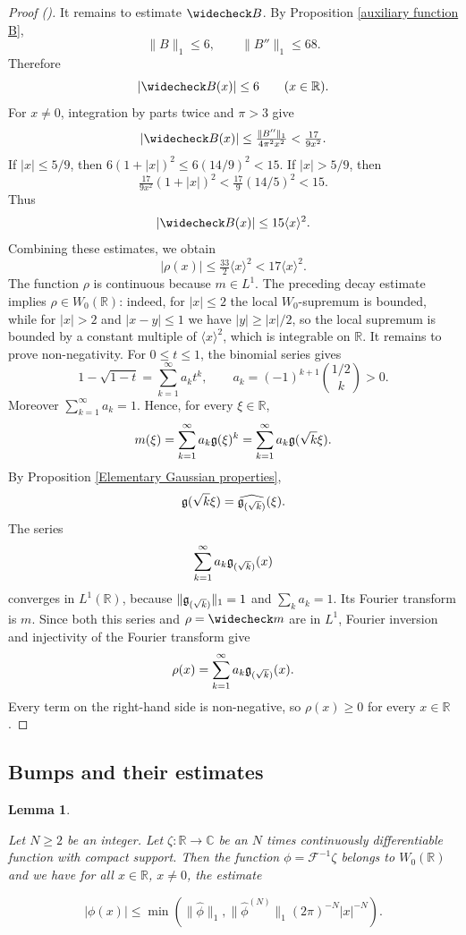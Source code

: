 \documentclass[12pt,reqno]{amsart}
\newcommand{\auto}{{({\tiny\faCar})}}
\theoremstyle{plain}
\newtheorem{lemma}[theorem]{Lemma}
\numberwithin{equation}{section}
\theoremstyle{remark}
\newcommand{\uses}[1]{}
\newcommand{\usesdefs}[1]{}
\newcommand{\leanok}{}
\newcommand{\lean}[1]{}
\newcommand{\R}{{\mathbb R}}
\newcommand{\C}{{\mathbb C}}
\begin{document}
\begin{proof}[Proof \auto]
It remains to estimate \(\widecheck B\). By Proposition \ref{auxiliary function B},
\[
    \|B\|_1\le 6,
    \qquad
    \|B''\|_1\le 68.
\]
Therefore
\[
    |\widecheck B(x)|\le 6
    \qquad (x\in\R).
\]
For \(x\neq 0\), integration by parts twice and $\pi>3$ give
\[
    |\widecheck B(x)|
    \le
    \tfrac{\|B''\|_1}{4\pi^2x^2}
    <
    \tfrac{17}{9x^2}.
\]
If $|x|\le5/9$, then
$6(1+|x|)^2\le6(14/9)^2<15$.
If $|x|>5/9$, then
\[
\tfrac{17}{9x^2}(1+|x|)^2
<\tfrac{17}{9}(14/5)^2<15.
\]
Thus
\begin{equation}\label{eq:Bcheck-decay}
|\widecheck B(x)|\le15\langle x\rangle^2.
\end{equation}
Combining these estimates, we obtain
\[
|\rho(x)|\le\tfrac{33}{2}\langle x\rangle^2
<17\langle x\rangle^2.
\]
The function \(\rho\) is continuous because \(m\in L^1\). The preceding decay estimate implies
\(\rho\in W_0(\R)\): indeed, for \(|x|\le 2\) the local \(W_0\)-supremum is bounded, while for
\(|x|>2\) and \(|x-y|\le 1\) we have \(|y|\ge |x|/2\), so the local supremum is bounded by a
constant multiple of \(\langle x\rangle^{2}\), which is integrable on \(\R\).
It remains to prove non-negativity. For \(0\le t\le 1\), the binomial series gives
\[
    1-\sqrt{1-t}
    =
    \sum_{k=1}^\infty a_k t^k,
    \qquad
    a_k=(-1)^{k+1}\binom{1/2}{k}>0.
\]
Moreover \(\sum_{k=1}^\infty a_k=1\). Hence, for every \(\xi\in\R\),
\[
    m(\xi)
    =
    \sum_{k=1}^\infty a_k \mathfrak{g}(\xi)^k
    =
    \sum_{k=1}^\infty a_k \mathfrak{g}(\sqrt{k}\xi).
\]
By Proposition \ref{Elementary Gaussian properties},
\[
    \mathfrak{g}(\sqrt{k}\xi)=\widehat{\mathfrak{g}_{(\sqrt{k})}}(\xi).
\]
The series
\[
\sum_{k=1}^\infty a_k\mathfrak{g}_{(\sqrt{k})}(x)
\]
converges in $L^1(\R)$, because $\|\mathfrak{g}_{(\sqrt{k})}\|_1=1$ and $\sum_ka_k=1$. Its Fourier transform is $m$. Since both this series and $\rho=\widecheck m$ are in $L^1$, Fourier inversion and injectivity of the Fourier transform give
\[
    \rho(x)
    =
    \sum_{k=1}^\infty a_k \mathfrak{g}_{(\sqrt{k})}(x).
\]
Every term on the right-hand side is non-negative, so \(\rho(x)\ge 0\) for every \(x\in\R\).
\end{proof}

\subsection{Bumps and their estimates}\label{bump section}


\begin{lemma}
\label{lem:smoothdecay}\uses{}\usesdefs{auto:Wiener-space-definition}
\lean{Auto.smoothDecay}
\leanok
Let $N\geq 2$ be an integer. Let $\zeta:\R\to\C$ be an $N$ times continuously differentiable function with compact support. Then the function $\phi=\mathcal F^{-1}\zeta$ belongs to $W_0(\R)$ and we have for all $x\in\R$, $x\neq0$, the estimate


\begin{equation}\label{auto:Fourier-decay-minimum-bound}|\phi(x)|\le \min(\|\widehat{\phi}\|_1, \|\widehat{\phi}^{(N)}\|_1 (2\pi)^{-N} |x|^{-N}).\end{equation}
\end{lemma}
\end{document}
